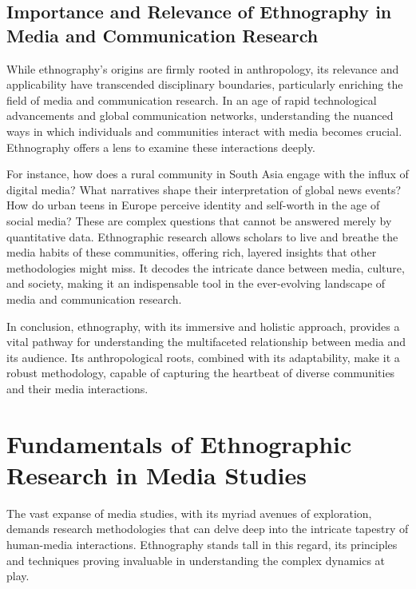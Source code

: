 \documentclass[
  b5paper]{book}
\begin{document}
\hypertarget{importance-and-relevance-of-ethnography-in-media-and-communication-research}{%
\subsection*{Importance and Relevance of Ethnography in Media and Communication Research}\label{importance-and-relevance-of-ethnography-in-media-and-communication-research}}

While ethnography's origins are firmly rooted in anthropology, its relevance and applicability have transcended disciplinary boundaries, particularly enriching the field of media and communication research. In an age of rapid technological advancements and global communication networks, understanding the nuanced ways in which individuals and communities interact with media becomes crucial. Ethnography offers a lens to examine these interactions deeply.

For instance, how does a rural community in South Asia engage with the influx of digital media? What narratives shape their interpretation of global news events? How do urban teens in Europe perceive identity and self-worth in the age of social media? These are complex questions that cannot be answered merely by quantitative data. Ethnographic research allows scholars to live and breathe the media habits of these communities, offering rich, layered insights that other methodologies might miss. It decodes the intricate dance between media, culture, and society, making it an indispensable tool in the ever-evolving landscape of media and communication research.

In conclusion, ethnography, with its immersive and holistic approach, provides a vital pathway for understanding the multifaceted relationship between media and its audience. Its anthropological roots, combined with its adaptability, make it a robust methodology, capable of capturing the heartbeat of diverse communities and their media interactions.

\hypertarget{fundamentals-of-ethnographic-research-in-media-studies}{%
\section{Fundamentals of Ethnographic Research in Media Studies}\label{fundamentals-of-ethnographic-research-in-media-studies}}

The vast expanse of media studies, with its myriad avenues of exploration, demands research methodologies that can delve deep into the intricate tapestry of human-media interactions. Ethnography stands tall in this regard, its principles and techniques proving invaluable in understanding the complex dynamics at play.
\end{document}
